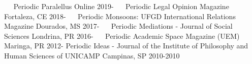 \begin{cvhonors}
   \cvhonor
    {Periodic}
    {Paralellus}
    {Online}
    {2019-}
   \cvhonor
    {Periodic}
    {Legal Opinion Magazine}
    {Fortaleza, CE}
    {2018-}
   \cvhonor
    {Periodic}
    {Monsoons: UFGD International Relations Magazine}
    {Dourados, MS}
    {2017-}
   \cvhonor
    {Periodic}
    {Mediations - Journal of Social Sciences}
    {Londrina, PR}
    {2016-}
   \cvhonor
    {Periodic}
    {Academic Space Magazine (UEM)}
    {Maringa, PR}
    {2012-}
  \cvhonor
    {Periodic}
    {Ideas - Journal of the Institute of Philosophy and Human Sciences of UNICAMP}
    {Campinas, SP}
    {2010-2010}
\end{cvhonors}
